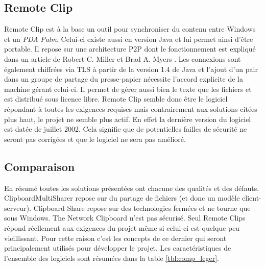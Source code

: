 \subsection{Remote Clip}
Remote Clip \cite{remoteclip} est à la base un outil pour synchroniser
du contenu entre Windows et un \emph{PDA} \emph{Palm}. Celui-ci existe
aussi en version Java et lui permet ainsi d'être portable. Il repose sur une
architecture P2P dont le fonctionnement est expliqué dans un article de Robert
C. Miller et Brad A. Myers \cite{Miller99syncclips}. Les connexions sont
également chiffrées via TLS à partir de la version 1.4 de Java et
l'ajout d'un pair dans un groupe de partage du presse-papier nécessite
l'accord explicite de la machine gérant celui-ci. Il permet de gérer aussi
bien le texte que les fichiers et est distribué sous licence libre.
Remote Clip semble donc être le logiciel répondant à toutes les
exigences requises mais contrairement aux solutions citées plus haut,
le projet ne semble plus actif. En effet la dernière version du logiciel
est datée de juillet 2002. Cela signifie que de potentielles failles
de sécurité ne seront pas corrigées et que le logiciel ne sera pas amélioré.

\subsection{Comparaison}
En résumé toutes les solutions présentées ont chacune des qualités et des
défauts. ClipboardMultiSharer repose sur du partage de fichiers (et donc un
modèle client-serveur). Clipboard Share repose sur des technologies fermées
et ne tourne que sous Windows. The Network Clipboard n'est pas sécurisé.
Seul Remote Clips répond réellement aux exigences du projet même si celui-ci
est quelque peu vieillissant. Pour cette raison c'est les concepts de ce
dernier qui seront principalement utilisés pour développer le projet.
Les caractéristiques de l'ensemble des logiciels sont résumées dans la
table \ref{tbl:comp_leger}.

